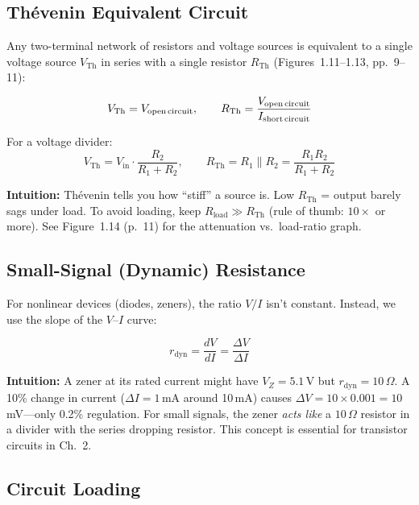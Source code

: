 \documentclass[11pt,a4paper]{article}
\newcommand{\intuition}[1]{\par\textcolor{intuition}{\textbf{Intuition:}} #1}
\begin{document}
\subsection{Th\'{e}venin Equivalent Circuit}

Any two-terminal network of resistors and voltage sources is equivalent to a single voltage source $V_{\text{Th}}$ in series with a single resistor $R_{\text{Th}}$ (Figures~1.11--1.13, pp.~9--11):

\begin{equation}
V_{\text{Th}} = V_{\text{open\,circuit}}, \qquad
R_{\text{Th}} = \frac{V_{\text{open\,circuit}}}{I_{\text{short\,circuit}}}
\end{equation}

For a voltage divider:
\begin{equation}
V_{\text{Th}} = V_{\text{in}} \cdot \frac{R_2}{R_1 + R_2}, \qquad
R_{\text{Th}} = R_1 \| R_2 = \frac{R_1 R_2}{R_1 + R_2}
\end{equation}

\intuition{Th\'{e}venin tells you how ``stiff'' a source is. Low $R_{\text{Th}}$ = output barely sags under load. To avoid loading, keep $R_{\text{load}} \gg R_{\text{Th}}$ (rule of thumb: $10\times$ or more). See Figure~1.14 (p.~11) for the attenuation vs.\ load-ratio graph.}

\subsection{Small-Signal (Dynamic) Resistance}

For nonlinear devices (diodes, zeners), the ratio $V/I$ isn't constant. Instead, we use the slope of the $V$--$I$ curve:

\begin{equation}
r_{\text{dyn}} = \frac{dV}{dI} = \frac{\Delta V}{\Delta I}
\end{equation}

\intuition{A zener at its rated current might have $V_Z = 5.1\,$V but $r_{\text{dyn}} = 10\,\Omega$. A 10\% change in current ($\Delta I = 1\,$mA around 10\,mA) causes $\Delta V = 10 \times 0.001 = 10\,$mV---only 0.2\% regulation. For small signals, the zener \emph{acts like} a $10\,\Omega$ resistor in a divider with the series dropping resistor. This concept is essential for transistor circuits in Ch.~2.}

\subsection{Circuit Loading}
\end{document}
